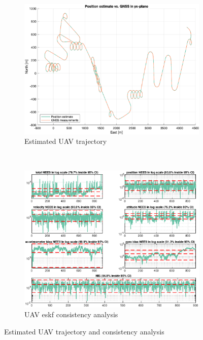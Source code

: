 \begin{figure}[ht]
    \centering
	\begin{subfigure}[b]{0.4\textwidth}
		\includegraphics[width=\textwidth]{figures/ga_2/sim_trajectory.eps}
    \caption{Estimated UAV trajectory}
    \label{fig:ga_2_sim_trajectory}
	\end{subfigure}%
       ~
	\begin{subfigure}[b]{0.4\textwidth}
		\includegraphics[width=\textwidth]{figures/ga_2/sim_consistency.eps}
    \caption{UAV \acrshort{eskf} consistency analysis}
    \label{fig:ga_2_sim_consistency}
    \end{subfigure}
    \caption{Estimated UAV trajectory and consistency analysis}
    \label{fig:ga_2_sim_trajectory_consistency} 
\end{figure}

